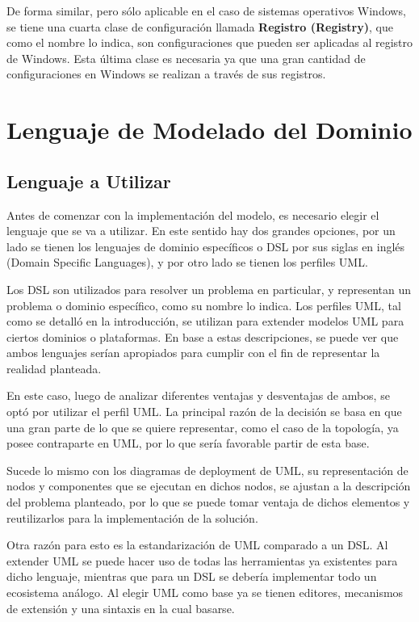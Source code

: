 De forma similar, pero sólo aplicable en el caso de sistemas operativos Windows, se tiene una cuarta clase de configuración llamada \textbf{Registro (Registry)}, que como el nombre lo indica, son configuraciones que pueden ser aplicadas al registro de Windows. Esta última clase es necesaria ya que una gran cantidad de configuraciones en Windows se realizan a través de sus registros.

\section{Lenguaje de Modelado del Dominio}

\subsection{Lenguaje a Utilizar}
Antes de comenzar con la implementación del modelo, es necesario elegir el lenguaje que se va a utilizar. En este sentido hay dos grandes opciones, por un lado se tienen los lenguajes de dominio específicos o DSL por sus siglas en inglés (Domain Specific Languages), y por otro lado se tienen los perfiles UML. 

Los DSL son utilizados para resolver un problema en particular, y representan un problema o dominio específico, como su nombre lo indica.
Los perfiles UML, tal como se detalló en la introducción, se utilizan para extender modelos UML para ciertos dominios o plataformas.
En base a estas descripciones, se puede ver que ambos lenguajes serían apropiados para cumplir con el fin de representar la realidad planteada. 

En este caso, luego de analizar diferentes ventajas y desventajas de ambos, se optó por utilizar el perfil UML. La principal razón de la decisión se basa en que una gran parte de lo que se quiere representar, como el caso de la topología, ya posee contraparte en UML, por lo que sería favorable partir de esta base. 

Sucede lo mismo con los diagramas de deployment de UML, su representación de nodos y componentes que se ejecutan en dichos nodos, se ajustan a la descripción del problema planteado, por lo que se puede tomar ventaja de dichos elementos y reutilizarlos para la implementación de la solución.

Otra razón para esto es la estandarización de UML comparado a un DSL. Al extender UML se puede hacer uso de todas las herramientas ya existentes para dicho lenguaje, mientras que para un DSL se debería implementar todo un ecosistema análogo. Al elegir UML como base ya se tienen editores, mecanismos de extensión y una sintaxis en la cual basarse.

